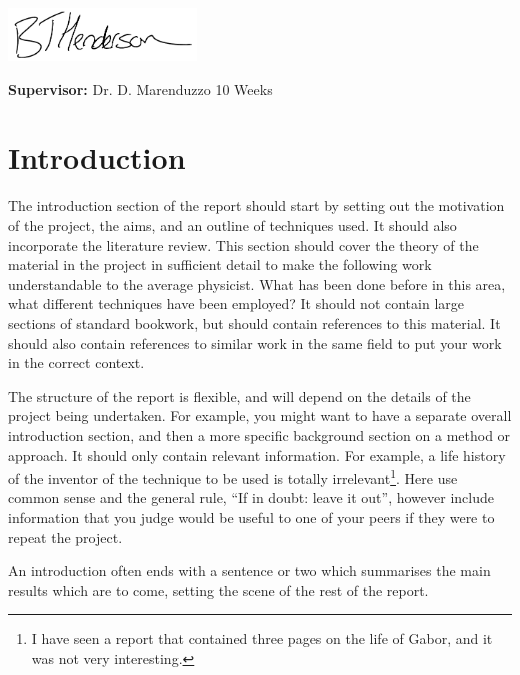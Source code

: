 \documentclass[a4paper,12pt]{article}
\begin{document}
\noindent\includegraphics[width=5cm]{Signature.pdf}         

\vfill
{\bf Supervisor:} Dr. D. Marenduzzo                 %
\hfill
10 Weeks                                         %
\newpage
%
\pagestyle{plain}                               %
\setcounter{page}{1}                            %
\tableofcontents                                %
\section{Introduction}

The introduction section of the report should start by setting out the
motivation of the project, the aims, and an outline of techniques used.
It should also incorporate the literature review. This section should 
cover the theory of the material in the project in sufficient detail to 
make the following work understandable to the average physicist. What has 
been done before in this area, what different techniques have been 
employed? It should not contain large sections of standard
bookwork, but should contain references to this material. It should also 
contain references to similar work in the same field to put your work in 
the correct context.

The structure of the report is flexible, and will depend on the details
of the project being undertaken. For example, you might want to have a 
separate overall introduction section, and then a more specific background section 
on a method or approach. It should only contain relevant information. For example, 
a life history of the inventor of the technique to be used is
totally irrelevant\footnote{I have seen a report that contained three pages
on the life of Gabor, and it was not very interesting.}. Here use common sense
and the general rule, ``If in doubt: leave it out'', however
include information that you judge would be useful to one of your
peers if they were to repeat the project.

An introduction often ends with a sentence or two which summarises the main
results which are to come, setting the scene of the rest of the report. 
\end{document}
